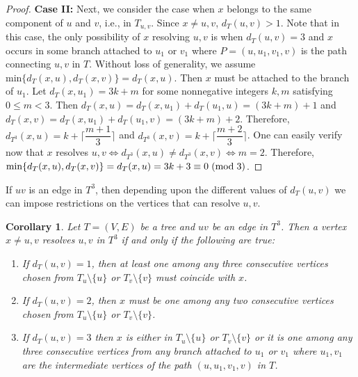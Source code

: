\documentclass{article}
\newtheorem{cor}[thm]{Corollary}
\theoremstyle{definition}
\numberwithin{equation}{section}
\begin{document}
\begin{proof}
\vspace{0.3em}
\noindent \textbf{Case II:} Next, we consider the case when $x$ belongs to the same component of $u$ and $v$, i.e., in $T_{u,v}$. Since $x\neq u,v$, $d_{T}(u,v)>1$. Note that in this case, the only possibility of $x$ resolving $u,v$ is when $d_{T}(u,v)=3$ and $x$ occurs in some branch attached to $u_{1}$ or $v_{1}$ where $P=(u,u_{1},v_{1},v)$ is the path connecting $u,v$ in $T$. Without loss of generality, we assume $\text{min}\{d_{T}(x,u),d_{T}(x,v)\}=d_{T}(x,u)$. Then $x$ must be attached to the branch of $u_{1}$. Let $d_{T}(x,u_{1})=3k+m$ for some nonnegative integers $k,m$ satisfying $0\leq m<3$. Then $d_{T}(x,u)=d_{T}(x,u_{1})+d_{T}(u_{1},u)=(3k+m)+1$ and $d_{T}(x,v)=d_{T}(x,u_{1})+d_{T}(u_{1},v)=(3k+m)+2$. Therefore, $d_{T^{3}}(x,u)=k+\lceil \dfrac{m+1}{3}\rceil$ and $d_{T^{3}}(x,v)=k+\lceil \dfrac{m+2}{3}\rceil$. One can easily verify now that $x$ resolves $u,v \Longleftrightarrow d_{T^{3}}(x,u)\neq d_{T^{3}}(x,v)\Longleftrightarrow m=2$. Therefore, $\text{min}\{d_{T}(x,u),d_{T}(x,v)\}=d_{T}(x,u)=3k+3\equiv 0 \hspace{0.3em} (\text{mod} \hspace{0.3em} 3)$. 
\end{proof}  

If $uv$ is an edge in $T^{3}$, then depending upon the different values of $d_{T}(u,v)$ we can impose restrictions on the vertices that can resolve $u,v$. 

\begin{cor}\label{distance}
Let $T=(V,E)$ be a tree and $uv$ be an edge in $T^{3}$. Then a vertex $x\neq u,v$ resolves $u,v$ in $T^{3}$ if and only if the following are true:
\begin{enumerate}

\item  If $d_{T}(u,v)=1$, then at least one among any three consecutive vertices chosen from $T_{u}\setminus\{u\}$ or $T_{v}\setminus\{v\}$ must coincide with $x$. \label{one distance}




\item If $d_{T}(u,v)=2$, then $x$ must be one among any two consecutive vertices chosen from $T_{u}\setminus \{u\}$ or $T_{v}\setminus\{v\}$.\label{two distance}

\item If $d_{T}(u,v)=3$ then $x$ is either in $T_{u}\setminus\{u\}$ or $T_{v}\setminus\{v\}$ or it is one among any three consecutive vertices from any branch attached to $u_{1}$ or $v_{1}$ where $u_{1},v_{1}$ are the intermediate vertices of the path $(u,u_{1},v_{1},v)$ in $T$. \label{three distance}
 
\end{enumerate}
\end{cor}
\end{document}
